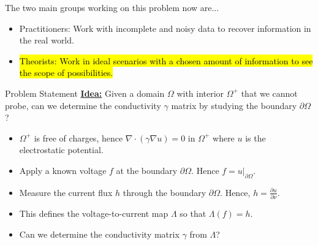 \documentclass[aspectratio=169]{beamer}
\makeatletter
\let\HL\hl
\renewcommand\hl{%
  \let\set@color\beamerorig@set@color
  \let\reset@color\beamerorig@reset@color
  \HL}
\makeatother
\begin{document}
\begin{frame}{}
\vfill
The two main groups working on this problem now are... 
    \begin{itemize}
        \item Practitioners: Work with incomplete and noisy data to recover information in the real world.
        
        \item \hl{Theorists: Work in ideal scenarios with a chosen amount of information to see the scope of possibilities.}
    \end{itemize}
\vfill
\end{frame}

\begin{frame}{Problem Statement}
\vfill
    \textbf{\underline{Idea:}} Given a domain $\Omega$ with interior $\Omega^+$ that we cannot probe, can we determine the conductivity $\gamma$ matrix by studying the boundary $\partial \Omega$? 
    \pause
    \begin{itemize}
        \item $\Omega^+$ is free of charges, hence $\nabla \cdot (\gamma \nabla u) = 0$ in $\Omega^+$ where $u$ is the electrostatic potential.
        
        \pause
        \item Apply a known voltage $f$ at the boundary $\partial \Omega$. Hence $f = u \vert_{\partial \Omega}$.
        
        \pause
        \item Measure the current flux $h$ through the boundary $\partial \Omega$. Hence, $h = \frac{\partial u}{\partial \nu}$.
        
        \pause
        \item This defines the voltage-to-current map $\Lambda$ so that $\Lambda(f) = h$.
        
        \pause
        \item Can we determine the conductivity matrix $\gamma$ from $\Lambda$?
    \end{itemize}
\vfill
\end{frame}
\end{document}
